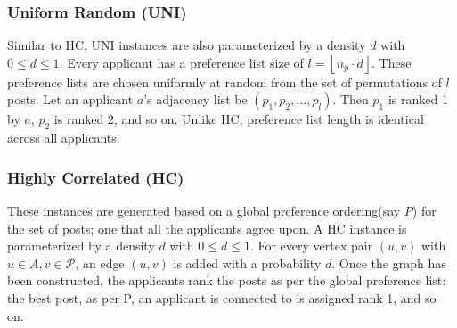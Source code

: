 \documentclass[letterpaper]{article} %
\begin{document}
\subsubsection{Uniform Random (UNI)}
Similar to HC, UNI instances are also parameterized by a density $d$ with $0 \le d \le 1$. Every applicant has a preference list size of $l = \left\lfloor n_{p}\cdot d\right\rfloor$. These preference lists are chosen uniformly at random from the set of permutations of $l$ posts. Let an applicant $a$'s adjacency list be $(p_{1}, p_{2}, ..., p_{l})$. Then $p_{1}$ is ranked 1 by $a$, $p_{2}$ is ranked 2, and so on. Unlike HC, preference list length is identical across all applicants.

\subsubsection{Highly Correlated (HC)}
These instances are generated based on a global preference ordering(say $P$) for the set of posts; one that all the applicants agree upon. A HC instance is parameterized by a density $d$ with $0 \le d \le 1$. For every vertex pair $(u, v)$ with $u \in A, v \in \mathcal{P}$, an edge $(u, v)$ is added with a probability $d$. Once the graph has been constructed, the applicants rank the posts as per the global preference list: the best post, as per P, an applicant is connected to is assigned rank 1, and so on.
\end{document}
